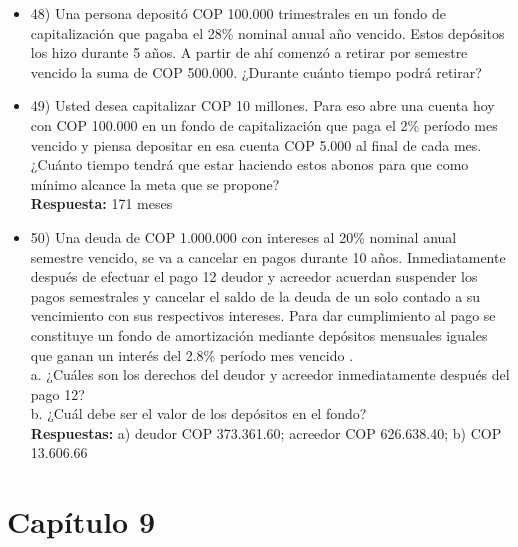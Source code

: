 \begin{itemize}
 \item 48) Una persona depositó COP 100.000 trimestrales en un fondo de capitalización que pagaba el 28\% nominal anual año vencido.  Estos depósitos los hizo durante 5 años. A partir de ahí comenzó a retirar por semestre vencido la suma de COP 500.000. ¿Durante cuánto tiempo podrá retirar? \\
       \medskip

 \item 49) Usted desea capitalizar COP 10 millones. Para eso abre una cuenta hoy con COP 100.000 en un fondo de capitalización que paga el 2\% período mes vencido  y piensa depositar en esa cuenta COP 5.000 al final de cada mes. ¿Cuánto tiempo tendrá que estar haciendo estos abonos para que como mínimo alcance la meta que se propone? \\
       \textbf{Respuesta: }171 meses
       \medskip

 \item 50) Una deuda de COP 1.000.000 con intereses al 20\% nominal anual semestre vencido, se va a cancelar en pagos  durante 10 años. Inmediatamente después de efectuar el pago 12 deudor y acreedor acuerdan suspender los pagos semestrales y cancelar el saldo de la deuda de un solo contado a su vencimiento con sus respectivos intereses. Para dar cumplimiento al pago se constituye un fondo de amortización mediante depósitos mensuales iguales que ganan un interés del 2.8\% período mes vencido . \\

       a.	¿Cuáles son los derechos del deudor y acreedor inmediatamente después del pago 12? \\
       b.	¿Cuál debe ser el valor de los depósitos en el fondo?\\
       \textbf{Respuestas:} a) deudor COP 373.361.60; acreedor COP 626.638.40; b) COP 13.606.66

\end{itemize}


\chapter*{Capítulo 9}


